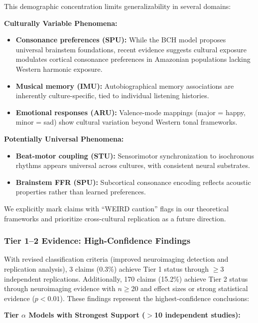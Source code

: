 \documentclass[9pt,onecolumn]{article}
\begin{document}
This demographic concentration limits generalizability in several domains:

\textbf{Culturally Variable Phenomena:}
\begin{itemize}[leftmargin=*, topsep=2pt, itemsep=1pt]
    \item \textbf{Consonance preferences (SPU):} While the BCH model proposes universal brainstem foundations, recent evidence suggests cultural exposure modulates cortical consonance preferences in Amazonian populations lacking Western harmonic exposure.
    \item \textbf{Musical memory (IMU):} Autobiographical memory associations are inherently culture-specific, tied to individual listening histories.
    \item \textbf{Emotional responses (ARU):} Valence-mode mappings (major = happy, minor = sad) show cultural variation beyond Western tonal frameworks.
\end{itemize}

\textbf{Potentially Universal Phenomena:}
\begin{itemize}[leftmargin=*, topsep=2pt, itemsep=1pt]
    \item \textbf{Beat-motor coupling (STU):} Sensorimotor synchronization to isochronous rhythms appears universal across cultures, with consistent neural substrates.
    \item \textbf{Brainstem FFR (SPU):} Subcortical consonance encoding reflects acoustic properties rather than learned preferences.
\end{itemize}

We explicitly mark claims with ``WEIRD caution'' flags in our theoretical frameworks and prioritize cross-cultural replication as a future direction.

\subsubsection{Tier 1--2 Evidence: High-Confidence Findings}

With revised classification criteria (improved neuroimaging detection and replication analysis), 3 claims (0.3\%) achieve Tier 1 status through $\geq$3 independent replications. Additionally, 170 claims (15.2\%) achieve Tier 2 status through neuroimaging evidence with $n\geq$20 and effect sizes or strong statistical evidence ($p<0.01$). These findings represent the highest-confidence conclusions:

\textbf{Tier $\alpha$ Models with Strongest Support ($>$10 independent studies):}
\end{document}
